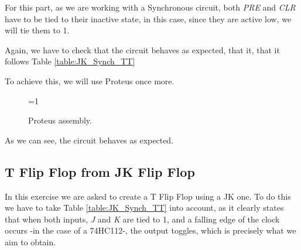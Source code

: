 \documentclass[a4paper, 11pt, oneside]{article}
\begin{document}
For this part, as we are working with a Synchronous circuit, both \textit{PRE} and \textit{CLR} have to be tied to their inactive state, in this case, since they are active low, we will tie them to 1.

Again, we have to check that the circuit behaves as expected, that it, that it follows Table \ref{table:JK_Synch_TT}

\newpage

To achieve this, we will use Proteus once more.

\begin{figure}[H]
    \centering
    
    \ifnum\value{ANIMATION}=1 {
    } 
    \fi
    
    \caption{Proteus assembly.}
    \label{fig:PROTEUS_JK_SYNCH}
\end{figure}

As we can see, the circuit behaves as expected.


\subsection{T Flip Flop from JK Flip Flop}

In this exercise we are asked to create a T Flip Flop using a JK one. To do this we have to take Table \ref{table:JK_Synch_TT} into account, as it clearly states that when both inputs, \textit{J} and \textit{K} are tied to 1, and a falling edge of the clock occurs -in the case of a 74HC112-, the output toggles, which is precisely what we aim to obtain.
\end{document}
